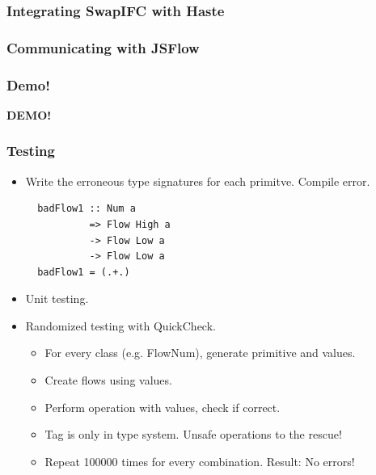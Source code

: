 \documentclass{beamer}
\begin{document}

\begin{frame}
  \frametitle{Integrating SwapIFC with Haste}
  
\end{frame}


\begin{frame}
  \frametitle{Communicating with JSFlow}
  
\end{frame}


\begin{frame}
  \frametitle{Demo!}
  \centering
  \Huge \textbf{DEMO!}
\end{frame}


\begin{frame}[fragile]
  \frametitle{Testing}
  \begin{itemize}
    \item Write the erroneous type signatures for each primitve. Compile error. \pause
\begin{verbatim}
  badFlow1 :: Num a
           => Flow High a
           -> Flow Low a
           -> Flow Low a
  badFlow1 = (.+.)
\end{verbatim}
\pause
    \item Unit testing. \pause
    \item Randomized testing with QuickCheck. \pause
      \begin{itemize}
        \item For every class (e.g. FlowNum), generate primitive and values. \pause
        \item Create flows using values. \pause
        \item Perform operation with values, check if correct. \pause
        \item Tag is only in type system. \pause Unsafe operations to the rescue! \pause
        \item Repeat 100000 times for every combination. \pause Result: No errors!
      \end{itemize}
  \end{itemize}
\end{frame}
\end{document}
